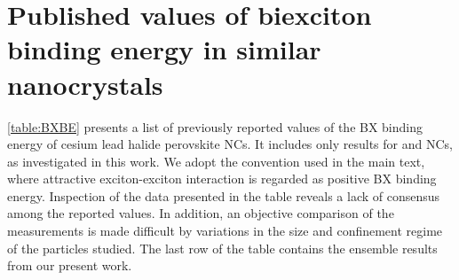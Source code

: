 \documentclass[journal=nalefd, manuscript=letter, layout=twocolumn]{achemso}
\begin{document}
\section{Published values of biexciton binding energy in similar nanocrystals}

\autoref{table:BXBE} presents a list of previously reported values of the BX binding energy of cesium lead halide perovskite NCs. It includes only results for  and  NCs, as investigated in this work. We adopt the convention used in the main text, where attractive exciton-exciton interaction is regarded as positive BX binding energy. Inspection of the data presented in the table reveals a lack of consensus among the reported values. In addition, an objective comparison of the measurements is made difficult by variations in the size and confinement regime of the particles studied. The last row of the table contains the ensemble results from our present work. 
\end{document}
